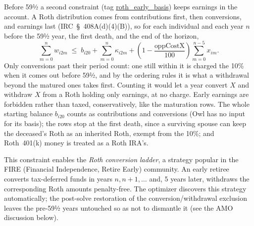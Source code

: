 \documentclass[fleqn,12pt]{report}
\newcommand{\code}[1]{\url{#1}}
\begin{document}
	Before 59½ a second constraint (tag \code{roth_early_basis}) keeps earnings in the account.
	A Roth distribution comes from contributions first, then conversions, and earnings last
	(IRC~§~408A(d)(4)(B)), so for each individual and each year $n$ before the 59½ year,
	the first death, and the end of the horizon,
	\begin{equation}
		\label{Eq:RothEarlyBasis}
		\sum_{m=0}^{n} w_{i2m} \;\le\; b_{i20} + \sum_{m=0}^{n} \kappa_{i2m}
		+ \left(1 - \frac{\textrm{oppCostX}}{100}\right) \sum_{m=0}^{n-5} x_{im}.
	\end{equation}
	Only conversions past their period count: one still within it is charged the 10\% when it
	comes out before 59½, and by the ordering rules it is what a withdrawal beyond the matured
	ones takes first.  Counting it would let a year convert $X$ and withdraw $X$ from a Roth
	holding only earnings, at no charge.  Early earnings are forbidden rather than taxed,
	conservatively, like the maturation rows.  The whole starting balance $b_{i20}$ counts as
	contributions and conversions (Owl has no input for its basis); the rows stop at the first
	death, since a surviving spouse can keep the deceased's Roth as an inherited Roth, exempt
	from the 10\%; and Roth~401(k) money is treated as a Roth IRA's.

	This constraint enables the \emph{Roth conversion ladder}, a strategy popular in the
	FIRE (Financial Independence, Retire Early) community.  An early retiree converts
	tax-deferred funds in years $n, n+1, \ldots$ and, 5 years later, withdraws the
	corresponding Roth amounts penalty-free.  The optimizer discovers this strategy
	automatically; the post-solve restoration of the conversion/withdrawal exclusion leaves the
	pre-59½ years untouched so as not to dismantle it (see the AMO discussion below).
\end{document}
